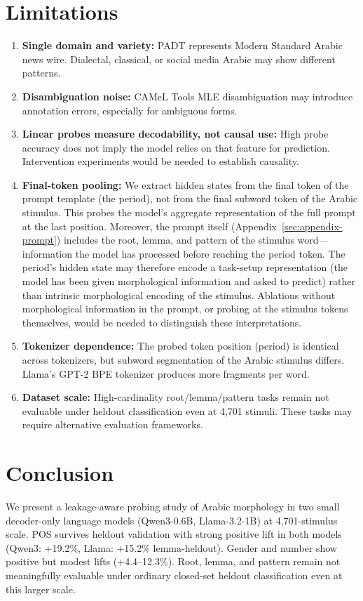 \documentclass[11pt,a4paper]{article}
\begin{document}
\section{Limitations}
\begin{enumerate}
\item \textbf{Single domain and variety:} PADT represents Modern Standard Arabic news wire. Dialectal, classical, or social media Arabic may show different patterns.
\item \textbf{Disambiguation noise:} CAMeL Tools MLE disambiguation may introduce annotation errors, especially for ambiguous forms.
\item \textbf{Linear probes measure decodability, not causal use:} High probe accuracy does not imply the model relies on that feature for prediction. Intervention experiments would be needed to establish causality.
\item \textbf{Final-token pooling:} We extract hidden states from the final token of the prompt template (the period), not from the final subword token of the Arabic stimulus. This probes the model's aggregate representation of the full prompt at the last position. Moreover, the prompt itself (Appendix~\ref{sec:appendix-prompt}) includes the root, lemma, and pattern of the stimulus word---information the model has processed before reaching the period token. The period's hidden state may therefore encode a task-setup representation (the model has been given morphological information and asked to predict) rather than intrinsic morphological encoding of the stimulus. Ablations without morphological information in the prompt, or probing at the stimulus tokens themselves, would be needed to distinguish these interpretations.
\item \textbf{Tokenizer dependence:} The probed token position (period) is identical across tokenizers, but subword segmentation of the Arabic stimulus differs. Llama's GPT-2 BPE tokenizer produces more fragments per word.
\item \textbf{Dataset scale:} High-cardinality root/lemma/pattern tasks remain not evaluable under heldout classification even at 4,701 stimuli. These tasks may require alternative evaluation frameworks.
\end{enumerate}

\section{Conclusion}
We present a leakage-aware probing study of Arabic morphology in two small decoder-only language models (Qwen3-0.6B, Llama-3.2-1B) at 4,701-stimulus scale. POS survives heldout validation with strong positive lift in both models (Qwen3: +19.2\%, Llama: +15.2\% lemma-heldout). Gender and number show positive but modest lifts (+4.4--12.3\%). Root, lemma, and pattern remain not meaningfully evaluable under ordinary closed-set heldout classification even at this larger scale.
\end{document}
